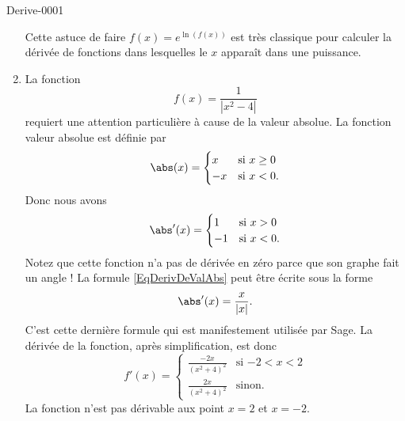 \begin{corrige}{Derive-0001}
\begin{enumerate}
		Cette astuce de faire $f(x)= e^{\ln (f(x)) }$ est très classique pour calculer la dérivée de fonctions dans lesquelles le $x$ apparaît dans une puissance.
	\item
		La fonction 
		\begin{equation}
			f(x)=\frac{1}{ | x^2-4 | }
		\end{equation}
		requiert une attention particulière à cause de la valeur absolue. La fonction valeur absolue est définie par
		\begin{equation}
			\abs(x)=\begin{cases}
				x	&	\text{si $x\geq 0$}\\
				-x	&	 \text{si $x<0$}.
			\end{cases}
		\end{equation}
		Donc nous avons
		\begin{equation}		\label{EqDerivDeValAbs}
			\abs'(x)=\begin{cases}
				1	&	\text{si $x>0$}\\
				-1	&	 \text{si $x<0$}.
			\end{cases}
		\end{equation}
		Notez que cette fonction n'a pas de dérivée en zéro parce que son graphe fait un angle ! La formule \eqref{EqDerivDeValAbs} peut être écrite sous la forme
		\begin{equation}
			\abs'(x)=\frac{ x }{ | x | }.
		\end{equation}
		C'est cette dernière formule qui est manifestement utilisée par Sage. La dérivée de la fonction, après simplification, est donc
		\begin{equation}
			f'(x)=\begin{cases}
				\frac{ -2x }{ (x^2+4)^2 }	&	\text{si $-2<x<2$}\\
				\frac{ 2x }{ (x^2+4)^2 }	&	 \text{sinon}.
			\end{cases}
		\end{equation}
		La fonction n'est pas dérivable aux point $x=2$ et $x=-2$.
\end{enumerate}

\end{corrige}
